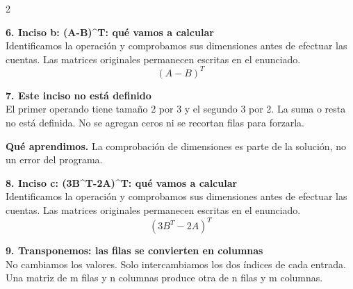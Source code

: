 \documentclass[11pt,a4paper,landscape]{article}
\begin{document}
\begin{multicols*}{2}
\begin{minipage}{\linewidth}
\end{minipage}\par\medskip
\noindent\begin{minipage}{\linewidth}\textbf{6. Inciso b: (A-B)\textasciicircum{}T: qué vamos a calcular}\\[2pt]Identificamos la operación y comprobamos sus dimensiones antes de efectuar las cuentas. Las matrices originales permanecen escritas en el enunciado.
\[(A-B)^T\]
\end{minipage}\par\medskip
\noindent\begin{minipage}{\linewidth}\textbf{7. Este inciso no está definido}\\[2pt]El primer operando tiene tamaño 2 por 3 y el segundo 3 por 2. La suma o resta no está definida. No se agregan ceros ni se recortan filas para forzarla.
\par\smallskip\textbf{Qué aprendimos.} La comprobación de dimensiones es parte de la solución, no un error del programa.
\end{minipage}\par\medskip
\noindent\begin{minipage}{\linewidth}\textbf{8. Inciso c: (3B\textasciicircum{}T-2A)\textasciicircum{}T: qué vamos a calcular}\\[2pt]Identificamos la operación y comprobamos sus dimensiones antes de efectuar las cuentas. Las matrices originales permanecen escritas en el enunciado.
\[(3B^T-2A)^T\]
\end{minipage}\par\medskip
\noindent\begin{minipage}{\linewidth}\textbf{9. Transponemos: las filas se convierten en columnas}\\[2pt]No cambiamos los valores. Solo intercambiamos los dos índices de cada entrada. Una matriz de m filas y n columnas produce otra de n filas y m columnas.
\par{}\par\smallskip

\end{minipage}
\end{multicols*}
\end{document}
